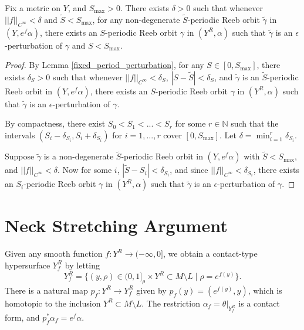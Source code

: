 \documentclass{article}
\numberwithin{equation}{section}
\numberwithin{figure}{section}
\begin{document}
\begin{lem}
\label{bounded_period_perturbation}
    Fix a metric on $Y$, and $S_{\max}>0$. There exists $\delta>0$ such that whenever $||f||_{C^\infty}<\delta$ and $\tilde{S}<S_{\max}$, for any non-degenerate $\tilde{S}$-periodic Reeb orbit $\tilde{\gamma}$ in $(Y,e^f\alpha)$, there exists an $S$-periodic Reeb orbit $\gamma$ in $(Y^R,\alpha)$ such that $\tilde{\gamma}$ is an $\epsilon$-perturbation of $\gamma$ and $S<S_{\max}$.
\end{lem}
\begin{proof}
By Lemma \ref{fixed_period_perturbation}, for any $S\in [0,S_{\max}]$, there exists $\delta_S>0$ such that whenever $||f||_{C^\infty}<\delta_S$, $|S-\tilde{S}|<\delta_S$, and $\tilde{\gamma}$ is an $\tilde{S}$-periodic Reeb orbit in $(Y,e^f\alpha)$, there exists an $S$-periodic Reeb orbit $\gamma$ in $(Y^R,\alpha)$ such that $\tilde{\gamma}$ is an $\epsilon$-perturbation of $\gamma$.

By compactness, there exist $S_0<S_1<...<S_r$ for some $r\in\mathbb{N}$ such that the intervals $(S_i-\delta_{S_i},S_i+\delta_{S_i})$ for $i=1,...,r$ cover $[0,S_{\max}]$. Let $\delta=\min_{i=1}^r\delta_{S_i}$.

Suppose $\tilde{\gamma}$ is a non-degenerate $\tilde{S}$-periodic Reeb orbit in $(Y,e^f\alpha)$ with $\tilde{S}<S_{\max}$, and $||f||_{C^\infty}<\delta$. Now for some $i$, $|\tilde{S}-S_i|<\delta_{S_i}$, and since $||f||_{C^\infty}<\delta_{S_i}$, there exists an $S_i$-periodic Reeb orbit $\gamma$ in $(Y^R,\alpha)$ such that $\tilde{\gamma}$ is an $\epsilon$-perturbation of $\gamma$.
\end{proof}

\section{Neck Stretching Argument}
\begin{defn}
\label{perturbed_surface}
Given any smooth function $f:Y^R\rightarrow (-\infty,0]$, we obtain a contact-type hypersurface $Y^R_f$ by letting
\begin{equation}
    Y^R_f=\{(y,\rho)\in (0,1]_\rho\times Y^R\subset M\setminus L\; |\; \rho=e^{f(y)}\}.
\end{equation}
There is a natural map $p_f:Y^R\rightarrow Y^R_f$ given by $p_f(y)=(e^{f(y)},y)$, which is homotopic to the inclusion $Y^R\subset M\setminus L$. The restriction $\alpha_f=\theta|_{Y^R_f}$ is a contact form, and $p_f^*\alpha_f=e^f\alpha$.
\end{defn}
\end{document}
